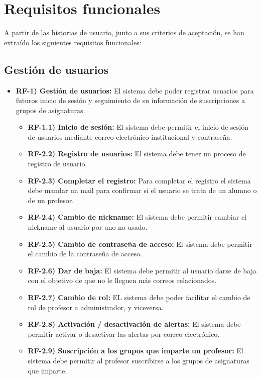 \section{Requisitos funcionales}

A partir de las historias de usuario, junto a sus criterios de aceptación, se han extraído los siguientes requisitos funcionales:

\subsection{Gestión de usuarios}

\begin{itemize}
    \item \textbf{RF-1) Gestión de usuarios:} El sistema debe poder registrar usuarios para futuros inicio de sesión y seguimiento de su información de suscripciones a grupos de asignaturas.
    \begin{itemize}
        \item \textbf{RF-1.1) Inicio de sesión:} El sistema debe permitir el inicio de sesión de usuarios mediante correo electrónico institucional y contraseña.
        \item \textbf{RF-2.2) Registro de usuarios:} El sistema debe tener un proceso de registro de usuario.
        \item \textbf{RF-2.3) Completar el registro:} Para completar el registro el sistema debe mandar un mail para confirmar si el usuario se trata de un alumno o de un profesor.
        \item \textbf{RF-2.4) Cambio de nickname:} El sistema debe permitir cambiar el nickname al usuario por uno no usado.
        \item \textbf{RF-2.5) Cambio de contraseña de acceso:} El sistema debe permitir el cambio de la contraseña de acceso.
        \item \textbf{RF-2.6) Dar de baja:} El sistema debe permitir al usuario darse de baja con el objetivo de que no le lleguen más correos relacionados.
        \item \textbf{RF-2.7) Cambio de rol:} EL sistema debe poder facilitar el cambio de rol de profesor a administrador, y viceversa.
        \item \textbf{RF-2.8) Activación / desactivación de alertas:} El sistema debe permitir activar o desactivar las alertas por correo electrónico.
        \item \textbf{RF-2.9) Suscripción a los grupos que imparte un profesor:} El sistema debe permitir al profesor suscribirse a los grupos de asignaturas que imparte.
    \end{itemize}
\end{itemize}

